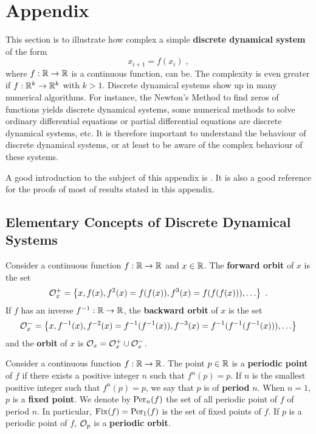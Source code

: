 \section{Appendix}

This section is to illustrate how complex a simple
{\bfseries discrete dynamical system}\label{Discrete Dynamical System}
of the form
\[
x_{i+1} = f(x_i)  \; ,
\]
where $f:\mathbb{R}\rightarrow \mathbb{R}$ is a continuous function, can be.  The
complexity is even greater if $f:\mathbb{R}^k \rightarrow \mathbb{R}^k$ with $k>1$.
Discrete dynamical systems show up in many numerical algorithms.
For instance, the Newton's Method to find zeros of functions yields
discrete dynamical systems, some numerical methods to solve ordinary
differential equations or partial differential equations are
discrete dynamical systems, etc.  It is therefore important to
understand the behaviour of discrete dynamical systems, or at least to
be aware of the complex behaviour of these systems. 

A good introduction to the subject of this appendix is \cite{D}.  It
is also a good reference for the proofs of most of results stated in this
appendix.

\subsection{Elementary Concepts of Discrete Dynamical Systems}

\begin{defn}
Consider a continuous function $f:\mathbb{R} \rightarrow \mathbb{R}$ and $x \in \mathbb{R}$.
The {\bfseries forward orbit} of $x$ is the set
\[
\mathcal{O}_x^+ = \left\{ x, f(x), f^2(x) = f(f(x)), f^3(x)= f(f(f(x))), \ldots
\right\} \  .
\]
If $f$ has an inverse $f^{-1}:\mathbb{R}\rightarrow \mathbb{R}$, the
{\bfseries backward orbit} of $x$ is the set
\[
\mathcal{O}_x^- = \left\{ x, f^{-1}(x), f^{-2}(x) = f^{-1}(f^{-1}(x)),
f^{-3}(x)= f^{-1}(f^{-1}(f^{-1}(x))), \ldots \right\}
\]
and the {\bfseries orbit} of $x$ is
$\mathcal{O}_x = \mathcal{O}_x^+ \cup \mathcal{O}_x^-$.
\end{defn}

\begin{defn}
Consider a continuous function $f:\mathbb{R} \rightarrow \mathbb{R}$.  The point
$p \in \mathbb{R}$ is a {\bfseries periodic point} of
$f$ if there exists a positive integer $n$ such that $f^n(p) = p$.  If
$n$ is the smallest positive integer such that $f^n(p)=p$, we say that
$p$ is of {\bfseries period} $n$.  When $n=1$, $p$ is a
{\bfseries fixed point}.
We denote by $\operatorname{Per}_n(f)$ the set of all periodic point of $f$ of
period $n$.  In particular, $\operatorname{Fix}(f) = \operatorname{Per}_1(f)$ is the set of fixed
points of $f$.  If $p$ is a periodic point of $f$, $\mathcal{O}_p$ is a
{\bfseries periodic orbit}.
\end{defn}

